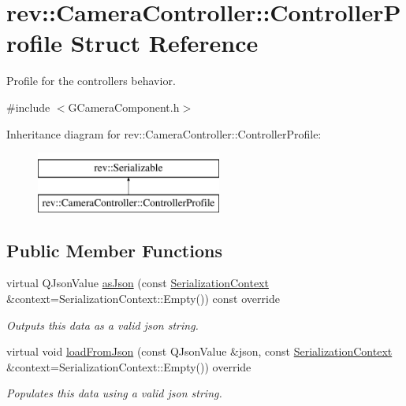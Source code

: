 \hypertarget{structrev_1_1_camera_controller_1_1_controller_profile}{}\section{rev\+::Camera\+Controller\+::Controller\+Profile Struct Reference}
\label{structrev_1_1_camera_controller_1_1_controller_profile}


Profile for the controller\textquotesingle{}s behavior.  




{\ttfamily \#include $<$G\+Camera\+Component.\+h$>$}

Inheritance diagram for rev\+::Camera\+Controller\+::Controller\+Profile\+:\begin{figure}[H]
\begin{center}
\leavevmode
\includegraphics[height=2.000000cm]{structrev_1_1_camera_controller_1_1_controller_profile}
\end{center}
\end{figure}
\subsection*{Public Member Functions}
\begin{DoxyCompactItemize}
\item 
\mbox{\label{structrev_1_1_camera_controller_1_1_controller_profile_ace91a1dc0967f3485a051e6569b97e0d}} 
virtual Q\+Json\+Value \mbox{\hyperlink{structrev_1_1_camera_controller_1_1_controller_profile_ace91a1dc0967f3485a051e6569b97e0d}{as\+Json}} (const \mbox{\hyperlink{structrev_1_1_serialization_context}{Serialization\+Context}} \&context=Serialization\+Context\+::\+Empty()) const override
\begin{DoxyCompactList}\small\item\em Outputs this data as a valid json string. \end{DoxyCompactList}\item 
\mbox{\label{structrev_1_1_camera_controller_1_1_controller_profile_a2a5e3ec386567e088564959d5ea3a00d}} 
virtual void \mbox{\hyperlink{structrev_1_1_camera_controller_1_1_controller_profile_a2a5e3ec386567e088564959d5ea3a00d}{load\+From\+Json}} (const Q\+Json\+Value \&json, const \mbox{\hyperlink{structrev_1_1_serialization_context}{Serialization\+Context}} \&context=Serialization\+Context\+::\+Empty()) override
\begin{DoxyCompactList}\small\item\em Populates this data using a valid json string. \end{DoxyCompactList}\end{DoxyCompactItemize}

